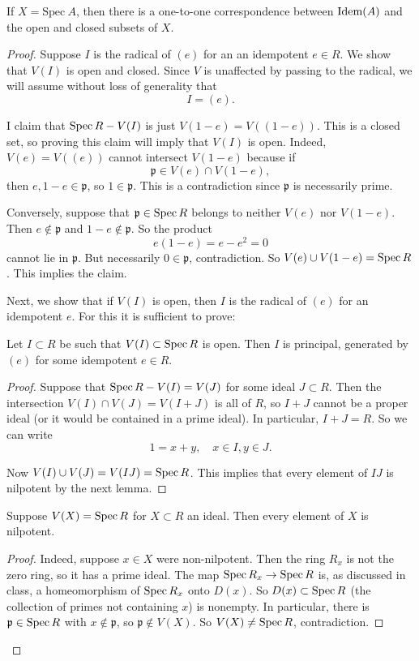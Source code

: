 \begin{proposition} If $X = \mathrm{Spec} \   A$, then there is a one-to-one
correspondence between $\operatorname{\text{Idem}}(A)$ and the open and closed subsets of $X$.
\end{proposition}
\begin{proof} Suppose $I$ is the radical of $(e)$ for an 
an idempotent $e \in R$. We show that $V(I)$ is open and closed. Since $V$ is
unaffected by passing to the radical, we will assume without loss of
generality that
\[ I = (e).  \]

I claim that $\operatorname{Spec} R - V(I)$ is just $V(1-e) = V((1-e))$. This is a closed
set, so proving this claim will imply that $V(I)$ is open.  Indeed,
$V(e)=V((e))$ cannot intersect $V(1-e)$ because if
\[ \mathfrak{p} \in V(e) \cap V(1-e),  \]
then $e, 1-e \in \mathfrak{p}$, so $1 \in \mathfrak{p}$. This is a
contradiction since $\mathfrak{p}$ is necessarily prime.

Conversely, suppose that $\mathfrak{p} \in \operatorname{Spec} R$ belongs to neither $V(e)$
nor $V(1-e)$. Then $e \notin \mathfrak{p}$ and $1-e \notin \mathfrak{p}$. So
the product
\[ e(1-e)  = e-e^2 = 0  \]
cannot lie in $\mathfrak{p}$. But necessarily $0 \in \mathfrak{p}$,
contradiction. So $V(e) \cup V(1-e) = \operatorname{Spec} R$. This implies the claim.

Next, we show that if $V(I)$ is open, then $I$ is the radical of $(e)$ for an
idempotent $e$. For this it is sufficient to  prove:

\begin{lemma} 
Let $I \subset R$ be such that $V(I) \subset \operatorname{Spec} R$ is open. Then $I$
is principal, generated by $(e)$ for some idempotent $e \in R$.
\end{lemma} 
\begin{proof} 
Suppose that $\operatorname{Spec} R - V(I) = V(J)$ for some ideal $J \subset R$. Then the
intersection $V(I) \cap V(J) = V(I+J)$ is all of $R$, so $I+J$ cannot be a
proper ideal (or it would be contained in a prime ideal). In particular, $I+J =
R$. So we can write
\[ 1 = x + y, \quad x \in I, y \in J.  \]

Now $V(I) \cup V(J) = V(IJ) = \operatorname{Spec} R$. This implies that every element of
$IJ$  is nilpotent by the next lemma.
\end{proof}
\begin{lemma} 
Suppose $V(X)=\operatorname{Spec} R$ for $X \subset R$ an ideal. Then every element of $X$ is
nilpotent.
\end{lemma}
\begin{proof} 
Indeed, suppose $x \in X$ were non-nilpotent.  Then the ring $R_x$ is not the
zero ring, so it has a prime ideal. The map $\operatorname{Spec} R_x \to \operatorname{Spec} R$ is, as
discussed in class, a homeomorphism of $\operatorname{Spec} R_x$ onto $D(x)$.  So $D(x)
\subset \operatorname{Spec} R$ (the collection of primes not containing $x$) is nonempty. In
particular, there is $\mathfrak{p} \in \operatorname{Spec} R$ with $x \notin \mathfrak{p}$,
so $\mathfrak{p} \notin V(X)$. So $V(X) \neq \operatorname{Spec} R$, contradiction.
\end{proof} 


\end{proof}
